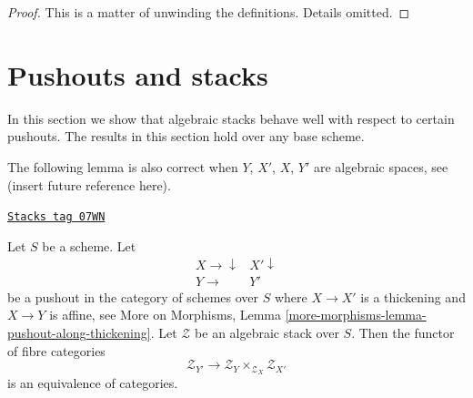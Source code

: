 \begin{proof}
This is a matter of unwinding the definitions. Details omitted.
\end{proof}

\section{Pushouts and stacks}
\label{artin-section-pushouts}
In this section we show that algebraic stacks behave well with
respect to certain pushouts. The results in this section hold over
any base scheme.

\medskip\noindent
The following lemma is also correct when $Y$, $X'$, $X$, $Y'$ are
algebraic spaces, see (insert future reference here).

\begin{lemma}
\label{artin-lemma-pushout}
\href{https://stacks.math.columbia.edu/tag/07WN}{\texttt{Stacks tag 07WN}}


Let $S$ be a scheme. Let
$$
\begin{array}{cc}X \longrightarrow\downarrow & X' \downarrow \\ Y \longrightarrow & Y'\end{array}
$$
be a pushout in the category of schemes over $S$ where $X \to X'$
is a thickening and $X \to Y$ is affine, see
More on Morphisms, Lemma \ref{more-morphisms-lemma-pushout-along-thickening}.
Let $\mathcal{Z}$ be an algebraic stack over $S$.
Then the functor of fibre categories
$$
\mathcal{Z}_{Y'}
\longrightarrow
\mathcal{Z}_Y \times_{\mathcal{Z}_X} \mathcal{Z}_{X'}
$$
is an equivalence of categories.
\end{lemma}

